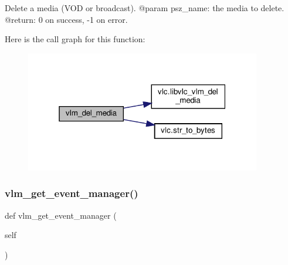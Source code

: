 \begin{DoxyVerb}Delete a media (VOD or broadcast).
@param psz_name: the media to delete.
@return: 0 on success, -1 on error.
\end{DoxyVerb}
 Here is the call graph for this function\+:
\nopagebreak
\begin{figure}[H]
\begin{center}
\leavevmode
\includegraphics[width=292pt]{classvlc_1_1_instance_a24a1e2bc7e41b02303d2f397246da726_cgraph}
\end{center}
\end{figure}
\mbox{\label{classvlc_1_1_instance_a1eb24fac1f012e58b9baf7dcb0676588}} 
\subsubsection{\texorpdfstring{vlm\+\_\+get\+\_\+event\+\_\+manager()}{vlm\_get\_event\_manager()}}
{\footnotesize\ttfamily def vlm\+\_\+get\+\_\+event\+\_\+manager (\begin{DoxyParamCaption}\item[{}]{self }\end{DoxyParamCaption})}

